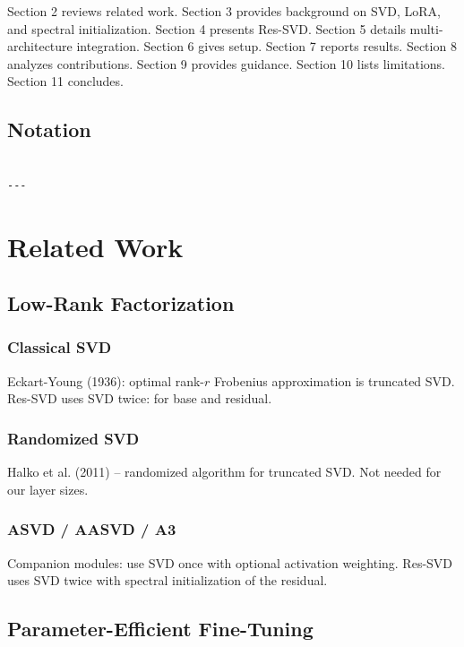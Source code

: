 Section 2 reviews related work. Section 3 provides background on SVD, LoRA, 
and spectral initialization. Section 4 presents Res-SVD. Section 5 details 
multi-architecture integration. Section 6 gives setup. Section 7 reports 
results. Section 8 analyzes contributions. Section 9 provides guidance. 
Section 10 lists limitations. Section 11 concludes.



\subsection{Notation}

\begin{lstlisting}

---
\end{lstlisting}

\section{Related Work}

\subsection{Low-Rank Factorization}

\subsubsection{Classical SVD}

Eckart-Young (1936): optimal rank-$r$ Frobenius approximation is truncated SVD. 
Res-SVD uses SVD twice: for base and residual.

\subsubsection{Randomized SVD}

Halko et al. (2011) -- randomized algorithm for truncated SVD. Not needed 
for our layer sizes.

\subsubsection{ASVD / AASVD / A3}

Companion modules: use SVD once with optional activation weighting. Res-SVD 
uses SVD twice with spectral initialization of the residual.

\subsection{Parameter-Efficient Fine-Tuning}

